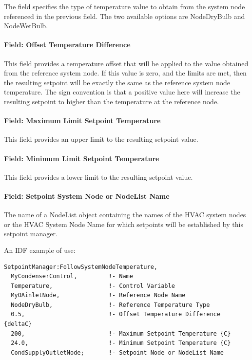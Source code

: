 The field specifies the type of temperature value to obtain from the system node referenced in the previous field. The two available options are NodeDryBulb and NodeWetBulb.

\paragraph{Field: Offset Temperature Difference}\label{field-offset-temperature-difference-1}

This field provides a temperature offset that will be applied to the value obtained from the reference system node. If this value is zero, and the limits are met, then the resulting setpoint will be exactly the same as the reference system node temperature. The sign convention is that a positive value here will increase the resulting setpoint to higher than the temperature at the reference node.

\paragraph{Field: Maximum Limit Setpoint Temperature}\label{field-maximum-limit-setpoint-temperature}

This field provides an upper limit to the resulting setpoint value.

\paragraph{Field: Minimum Limit Setpoint Temperature}\label{field-minimum-limit-setpoint-temperature}

This field provides a lower limit to the resulting setpoint value.

\paragraph{Field: Setpoint System Node or NodeList Name}\label{field-setpoint-system-node-or-nodelist-name}

The name of a \hyperref[nodelist]{NodeList} object containing the names of the HVAC system nodes or the HVAC System Node Name for which setpoints will be established by this setpoint manager.

An IDF example of use:

\begin{lstlisting}
SetpointManager:FollowSystemNodeTemperature,
  MyCondenserControl,         !- Name
  Temperature,                !- Control Variable
  MyOAinletNode,              !- Reference Node Name
  NodeDryBulb,                !- Reference Temperature Type
  0.5,                        !- Offset Temperature Difference {deltaC}
  200,                        !- Maximum Setpoint Temperature {C}
  24.0,                       !- Minimum Setpoint Temperature {C}
  CondSupplyOutletNode;       !- Setpoint Node or NodeList Name
\end{lstlisting}


